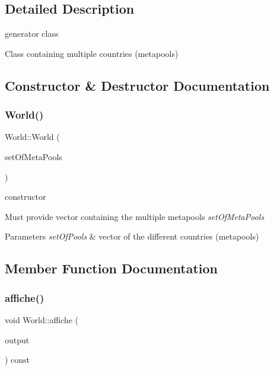\subsection{Detailed Description}
generator class 

Class containing multiple countries (metapools) 

\subsection{Constructor \& Destructor Documentation}
\hypertarget{class_world_aed1cdfa4b09eabaacaea9c13bf14e750}{}\label{class_world_aed1cdfa4b09eabaacaea9c13bf14e750} 
\subsubsection{\texorpdfstring{World()}{World()}}
{\footnotesize\ttfamily World\+::\+World (\begin{DoxyParamCaption}\item[{std\+::vector$<$ \hyperlink{class_metapool_drep}{Metapool\+Drep} $>$ const \&}]{set\+Of\+Meta\+Pools }\end{DoxyParamCaption})}



constructor 

Must provide vector containing the multiple metapools {\itshape set\+Of\+Meta\+Pools} 
\begin{DoxyParams}{Parameters}
{\em set\+Of\+Pools} & vector of the different countries (metapools) \\
\hline
\end{DoxyParams}


\subsection{Member Function Documentation}
\hypertarget{class_world_a9642cb87f57244d1c864d6e2f1b122dd}{}\label{class_world_a9642cb87f57244d1c864d6e2f1b122dd} 
\subsubsection{\texorpdfstring{affiche()}{affiche()}\hspace{0.1cm}{\footnotesize\ttfamily [1/2]}}
{\footnotesize\ttfamily void World\+::affiche (\begin{DoxyParamCaption}\item[{std\+::ostream \&}]{output }\end{DoxyParamCaption}) const}



